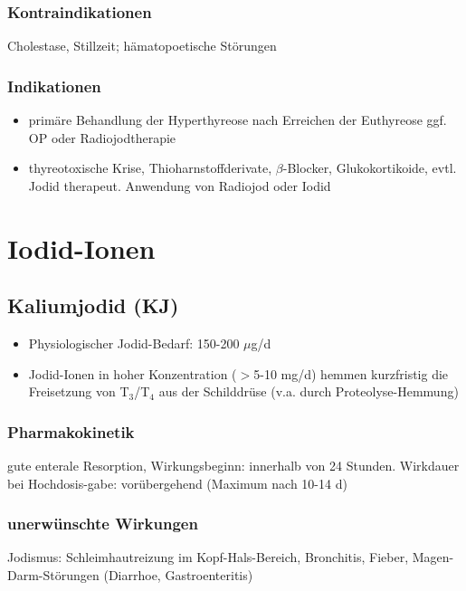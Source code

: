 \documentclass[10pt,a4paper]{report}
\begin{document}
\subsubsection{Kontraindikationen} %
\label{par:kontraindikationen}
Cholestase, Stillzeit; hämatopoetische Störungen
\subsubsection{Indikationen} %
\label{par:indikationen}
\begin{itemize}
	\item primäre Behandlung der Hyperthyreose
	nach Erreichen der Euthyreose ggf. OP oder Radiojodtherapie
	\item thyreotoxische Krise, Thioharnstoffderivate, 	$\beta$-Blocker, 	Glukokortikoide, 	evtl. Jodid
	therapeut. Anwendung von Radiojod oder Iodid
\end{itemize}
\section{Iodid-Ionen} %
\label{sec:iodid_ionen}
\subsection{Kaliumjodid (KJ)} %
\label{sub:kaliumjodid_}
\begin{itemize}
	\item Physiologischer Jodid-Bedarf: 150-200 $\mu$g/d
	\item Jodid-Ionen in hoher Konzentration ($>$5-10 mg/d) hemmen kurzfristig die Freisetzung von T$_3$/T$_4$ aus der Schilddrüse (v.a. durch Proteolyse-Hemmung)
\end{itemize}
\subsubsection{Pharmakokinetik} %
\label{par:pharmakokinetik}
gute enterale Resorption, Wirkungsbeginn: innerhalb von 24 Stunden. Wirkdauer bei Hochdosis-gabe: vorübergehend (Maximum nach 10-14 d)
\subsubsection{unerwünschte Wirkungen} %
\label{par:unerw_nschte_wirkungen}
Jodismus: Schleimhautreizung im Kopf-Hals-Bereich, Bronchitis, Fieber, Magen-Darm-Störungen (Diarrhoe, Gastroenteritis)
\end{document}
